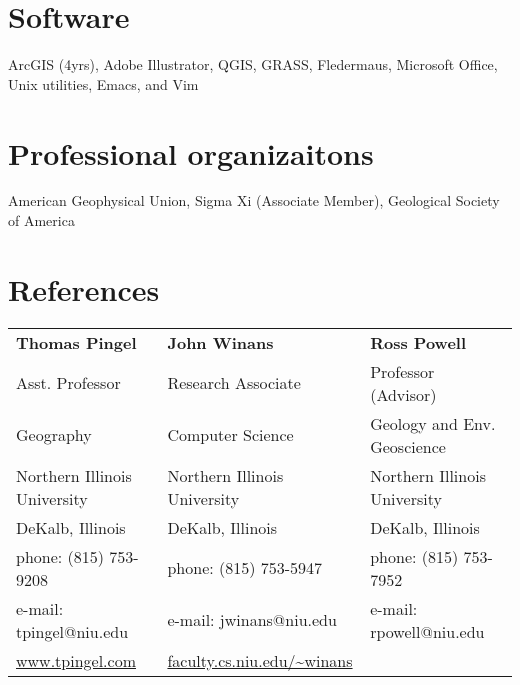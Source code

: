 \documentclass{cv_TOH}
\begin{document}
\section{Software}
ArcGIS (4yrs), Adobe Illustrator, QGIS, GRASS, Fledermaus, Microsoft Office, Unix utilities, Emacs, and Vim

\section{Professional organizaitons}
American Geophysical Union, Sigma Xi (Associate Member), Geological Society of America

\section{References}
\begin{tabular}{@{}p{6cm}p{6cm}p{6cm}}
 \textbf{Thomas Pingel}            & \textbf{John Winans}              &   \textbf{Ross Powell}           \\
 Asst. Professor                   &  Research Associate               &   Professor (Advisor)            \\ 
 Geography                         &  Computer Science                 &   Geology and Env. Geoscience    \\
 Northern Illinois University      &  Northern Illinois University     &   Northern Illinois University   \\ 
 DeKalb, Illinois                  &  DeKalb, Illinois                 &   DeKalb, Illinois               \\
 phone: (815) 753-9208             &  phone: (815) 753-5947            &   phone: (815) 753-7952          \\
 e-mail: tpingel@niu.edu           &  e-mail: jwinans@niu.edu          &   e-mail: rpowell@niu.edu        \\
 \url{www.tpingel.com}             &  \url{faculty.cs.niu.edu/~winans} &                                  \\     
\end{tabular}
\end{document}
